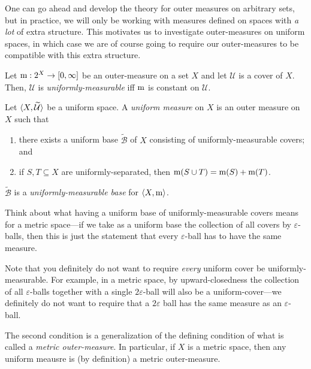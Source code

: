 One can go ahead and develop the theory for outer measures on arbitrary sets, but in practice, we will only be working with measures defined on spaces with \emph{a lot} of extra structure.  This motivates us to investigate outer-measures on uniform spaces, in which case we are of course going to require our outer-measures to be compatible with this extra structure.
\begin{dfn}\label{UniformlyMeasurable}
Let $\mathrm{m} :2^X\rightarrow [0,\infty ]$ be an outer-measure on a set $X$ and let $\mathcal{U}$ is a cover of $X$.  Then, $\mathcal{U}$ is \emph{uniformly-measurable} iff $\mathrm{m}$ is constant on $\mathcal{U}$.
\end{dfn}
\begin{dfn}\label{UniformMeasure}
Let $\langle X,\widetilde{\mathcal{U}}\rangle$ be a uniform space.  A \emph{uniform measure} on $X$ is an outer measure on $X$ such that
\begin{enumerate}
\item \label{UniformMeasure.i}there exists a uniform base $\widetilde{\mathcal{B}}$ of $X$ consisting of uniformly-measurable covers; and
\item \label{UniformMeasure.ii}if $S,T\subseteq X$ are uniformly-separated, then $\mathrm{m} (S\cup T)=\mathrm{m} (S)+\mathrm{m} (T)$.
\end{enumerate}
\begin{rmk}
$\widetilde{\mathcal{B}}$ is a \emph{uniformly-measurable base} for $\langle X,\mathrm{m}\rangle$.
\end{rmk}
\begin{rmk}
Think about what having a uniform base of uniformly-measurable covers means for a metric space---if we take as a uniform base the collection of all covers by $\varepsilon$-balls, then this is just the statement that every $\varepsilon$-ball has to have the same measure.
\end{rmk}
\begin{rmk}
Note that you definitely do not want to require \emph{every} uniform cover be uniformly-measurable.  For example, in a metric space, by upward-closedness the collection of all $\varepsilon$-balls together with a single $2\varepsilon$-ball will also be a uniform-cover---we definitely do not want to require that a $2\varepsilon$ ball has the same measure as an $\varepsilon$-ball.
\end{rmk}
\begin{rmk}
The second condition is a generalization of the defining condition of what is called a \emph{metric outer-measure}.  In particular, if $X$ is a metric space, then any uniform meausre is (by definition) a metric outer-measure.
\end{rmk}
\end{dfn}
